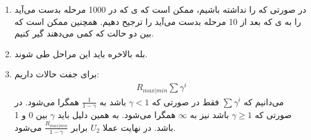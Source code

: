 \begin{enumerate}
    \item در صورتی که  را نداشته باشیم، ممکن است که ی
    که در 1000 مرحله بدست می‌آید را به
    ی
    که بعد از 10 مرحله بدست می‌آید را ترجیح دهیم. همچنین ممکن است که بین دو حالت که
    کمی می‌دهند گیر کنیم.
    \item بله بالاخره باید این مراحل طی شوند.
    \item برای جفت حالات داریم:
    \begin{gather*}
        R_{max|min} \sum \gamma^i
    \end{gather*}
    می‌دانیم که
    $\sum \gamma^i$
    فقط در صورتی که
    $\gamma < 1$
    باشد به
    $\frac{1}{1-\gamma}$
    همگرا می‌شود. در صورتی که
    $\gamma \ge 1$
    باشد نیز به
    $\infty$
    همگرا می‌شود. به همین دلیل باید
    $\gamma$
    بین 0 و 1 باشد. در نهایت عملا
    $U_2$
    برابر
    $\frac{R_{max|min}}{1-\gamma}$
    می‌شود.
\end{enumerate}


